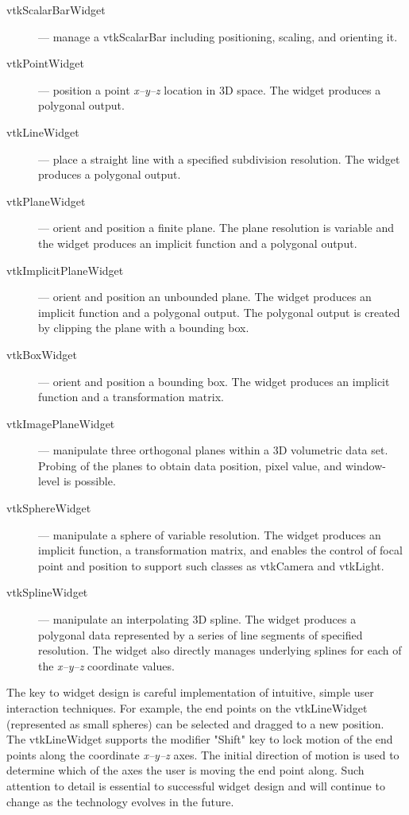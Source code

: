 \begin{description}

\item [vtkScalarBarWidget] --- manage a vtkScalarBar including positioning, scaling, and orienting it.

\item [vtkPointWidget] --- position a point \emph{x--y--z} location in 3D space. The widget produces a polygonal output.

\item [vtkLineWidget] --- place a straight line with a specified subdivision resolution. The widget produces a polygonal output.

\item [vtkPlaneWidget] --- orient and position a finite plane. The plane resolution is variable and the widget produces an implicit function and a polygonal output.

\item [vtkImplicitPlaneWidget] --- orient and position an unbounded plane. The widget produces an implicit function and a polygonal output. The polygonal output is created by clipping the plane with a bounding box.

\item [vtkBoxWidget] --- orient and position a bounding box. The widget produces an implicit function and a transformation matrix.

\item [vtkImagePlaneWidget] --- manipulate three orthogonal planes within a 3D volumetric data set. Probing of the planes to obtain data position, pixel value, and window-level is possible.

\item [vtkSphereWidget] --- manipulate a sphere of variable resolution. The widget produces an implicit function, a transformation matrix, and  enables the control of focal point and position to support such classes as vtkCamera and vtkLight.

\item [vtkSplineWidget] --- manipulate an interpolating 3D spline. The widget produces a polygonal data represented by a series of line segments of specified resolution. The widget also directly manages underlying splines for each of the \emph{x--y--z} coordinate values.

\end{description}

The key to widget design is careful implementation of intuitive, simple user interaction techniques. For example, the end points on the vtkLineWidget (represented as small spheres) can be selected and dragged to a new position. The vtkLineWidget supports the modifier "Shift" key to lock motion of the end points along the coordinate \emph{x--y--z} axes. The initial direction of motion is used to determine which of the axes the user is moving the end point along. Such attention to detail is essential to successful widget design and will continue to change as the technology evolves in the future.

